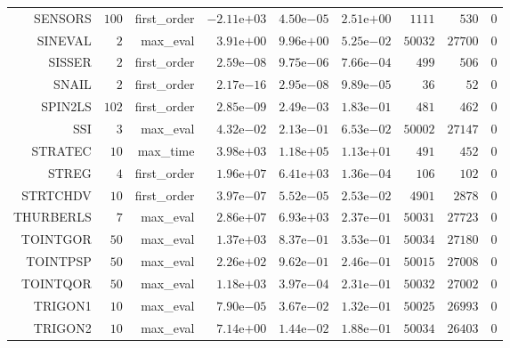 \begin{longtable}{rrrrrrrrr}
SENSORS & \(   100\) & first\_order & \(-2.11\)e\(+03\) & \( 4.50\)e\(-05\) & \( 2.51\)e\(+00\) & \(  1111\) & \(   530\) & \(     0\) \\
SINEVAL & \(     2\) & max\_eval & \( 3.91\)e\(+00\) & \( 9.96\)e\(+00\) & \( 5.25\)e\(-02\) & \( 50032\) & \( 27700\) & \(     0\) \\
SISSER & \(     2\) & first\_order & \( 2.59\)e\(-08\) & \( 9.75\)e\(-06\) & \( 7.66\)e\(-04\) & \(   499\) & \(   506\) & \(     0\) \\
SNAIL & \(     2\) & first\_order & \( 2.17\)e\(-16\) & \( 2.95\)e\(-08\) & \( 9.89\)e\(-05\) & \(    36\) & \(    52\) & \(     0\) \\
SPIN2LS & \(   102\) & first\_order & \( 2.85\)e\(-09\) & \( 2.49\)e\(-03\) & \( 1.83\)e\(-01\) & \(   481\) & \(   462\) & \(     0\) \\
SSI & \(     3\) & max\_eval & \( 4.32\)e\(-02\) & \( 2.13\)e\(-01\) & \( 6.53\)e\(-02\) & \( 50002\) & \( 27147\) & \(     0\) \\
STRATEC & \(    10\) & max\_time & \( 3.98\)e\(+03\) & \( 1.18\)e\(+05\) & \( 1.13\)e\(+01\) & \(   491\) & \(   452\) & \(     0\) \\
STREG & \(     4\) & first\_order & \( 1.96\)e\(+07\) & \( 6.41\)e\(+03\) & \( 1.36\)e\(-04\) & \(   106\) & \(   102\) & \(     0\) \\
STRTCHDV & \(    10\) & first\_order & \( 3.97\)e\(-07\) & \( 5.52\)e\(-05\) & \( 2.53\)e\(-02\) & \(  4901\) & \(  2878\) & \(     0\) \\
THURBERLS & \(     7\) & max\_eval & \( 2.86\)e\(+07\) & \( 6.93\)e\(+03\) & \( 2.37\)e\(-01\) & \( 50031\) & \( 27723\) & \(     0\) \\
TOINTGOR & \(    50\) & max\_eval & \( 1.37\)e\(+03\) & \( 8.37\)e\(-01\) & \( 3.53\)e\(-01\) & \( 50034\) & \( 27180\) & \(     0\) \\
TOINTPSP & \(    50\) & max\_eval & \( 2.26\)e\(+02\) & \( 9.62\)e\(-01\) & \( 2.46\)e\(-01\) & \( 50015\) & \( 27008\) & \(     0\) \\
TOINTQOR & \(    50\) & max\_eval & \( 1.18\)e\(+03\) & \( 3.97\)e\(-04\) & \( 2.31\)e\(-01\) & \( 50032\) & \( 27002\) & \(     0\) \\
TRIGON1 & \(    10\) & max\_eval & \( 7.90\)e\(-05\) & \( 3.67\)e\(-02\) & \( 1.32\)e\(-01\) & \( 50025\) & \( 26993\) & \(     0\) \\
TRIGON2 & \(    10\) & max\_eval & \( 7.14\)e\(+00\) & \( 1.44\)e\(-02\) & \( 1.88\)e\(-01\) & \( 50034\) & \( 26403\) & \(     0\) \\

\end{longtable}
